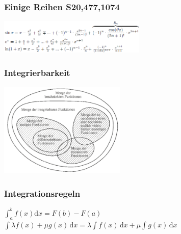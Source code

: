 \documentclass[6pt,a4paper]{scrartcl}
\begin{document}
\begin{multicols*}{2}
\begin{multicols}{2}
\subsubsection{Einige Reihen \color{red}S20,477,1074}
\includegraphics[width=7cm]{Reihen.PNG}\\
\subsubsection{Integrierbarkeit}
\includegraphics[width=6cm]{Integral.PNG}\\


\subsubsection{Integrationsregeln}
$\int_a^b f(x) \mathrm dx = F(b) - F(a)$\\
$\int\lambda f(x)+\mu g(x) \, \mathrm dx=\lambda\int f(x) \, \mathrm dx + \mu\int g(x) \, \mathrm dx$


\end{multicols}
\end{multicols*}
\end{document}
